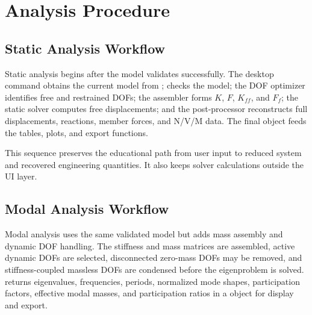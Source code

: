 \section{Analysis Procedure}

\subsection{Static Analysis Workflow}

Static analysis begins after the model validates successfully. The desktop command obtains the current model from ;  checks the model; the DOF optimizer identifies free and restrained DOFs; the assembler forms \(K\), \(F\), \(K_{ff}\), and \(F_f\); the static solver computes free displacements; and the post-processor reconstructs full displacements, reactions, member forces, and N/V/M data. The final  object feeds the tables, plots, and export functions.

This sequence preserves the educational path from user input to reduced system and recovered engineering quantities. It also keeps solver calculations outside the UI layer.

\subsection{Modal Analysis Workflow}

Modal analysis uses the same validated model but adds mass assembly and dynamic DOF handling. The stiffness and mass matrices are assembled, active dynamic DOFs are selected, disconnected zero-mass DOFs may be removed, and stiffness-coupled massless DOFs are condensed before the eigenproblem is solved.  returns eigenvalues, frequencies, periods, normalized mode shapes, participation factors, effective modal masses, and participation ratios in a  object for display and export.

